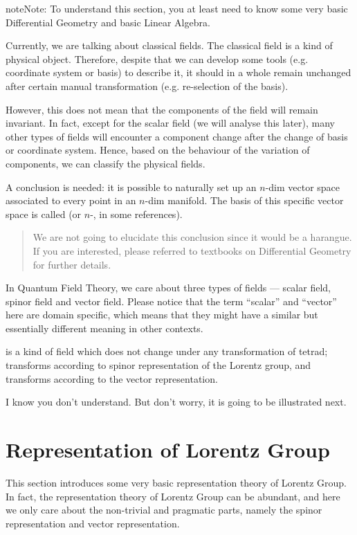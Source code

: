 \documentclass[letterpaper,10pt,english]{sphinxmanual}
\begin{document}
\begin{sphinxadmonition}{note}{Note:}
To understand this section, you at least need to know some very basic Differential Geometry and basic Linear Algebra.
\end{sphinxadmonition}

Currently, we are talking about classical fields. The classical field is a kind of physical object. Therefore, despite that we can develop some tools (e.g. coordinate system or basis) to describe it, it should in a whole remain unchanged after certain manual transformation (e.g. re-selection of the basis).

However, this does not mean that the components of the field will remain invariant. In fact, except for the scalar field (we will analyse this later), many other types of fields will encounter a component change after the change of basis or coordinate system. Hence, based on the behaviour of the variation of components, we can classify the physical fields.

A conclusion is needed: it is possible to naturally set up an \(n\)-dim vector space associated to every point in an \(n\)-dim manifold. The basis of this specific vector space is called  (or \(n\)-,  in some references).
\begin{quote}

We are not going to elucidate this conclusion since it would be a harangue. If you are interested, please referred to textbooks on Differential Geometry for further details.
\end{quote}

In Quantum Field Theory, we care about three types of fields --- scalar field, spinor field and vector field. Please notice that the term ``scalar'' and ``vector'' here are domain specific, which means that they might have a similar but essentially different meaning in other contexts.

 is a kind of field which does not change under any transformation of tetrad;  transforms according to spinor representation of the Lorentz group, and  transforms according to the vector representation.

I know you don't understand. But don't worry, it is going to be illustrated next.


\section{Representation of Lorentz Group}
\label{\detokenize{repr_lg::doc}}\label{\detokenize{repr_lg:representation-of-lorentz-group}}
This section introduces some very basic representation theory of Lorentz Group. In fact, the representation theory of Lorentz Group can be abundant, and here we only care about the non-trivial and pragmatic parts, namely the spinor representation and vector representation.
\end{document}
